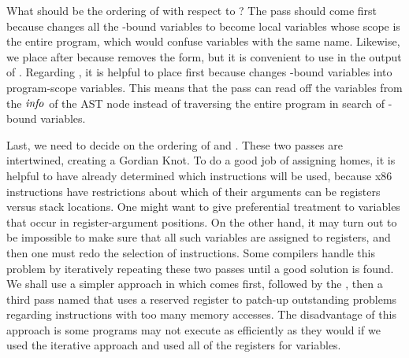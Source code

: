 \documentclass[11pt]{book}
\begin{document}
What should be the ordering of  with respect to
? The  pass should come first because
 changes all the -bound variables to
become local variables whose scope is the entire program, which would
confuse variables with the same name.
%
Likewise, we place  after
 because  removes
the  form, but it is convenient to use  in the
output of .
%
Regarding , it is helpful to place
 first because  changes
-bound variables into program-scope variables.  This means
that the  pass can read off the variables from the
$\mathit{info}$ of the  AST node instead of traversing the
entire program in search of -bound variables.

Last, we need to decide on the ordering of 
and .  These two passes are intertwined, creating a
Gordian Knot. To do a good job of assigning homes, it is helpful to
have already determined which instructions will be used, because x86
instructions have restrictions about which of their arguments can be
registers versus stack locations. One might want to give preferential
treatment to variables that occur in register-argument positions. On
the other hand, it may turn out to be impossible to make sure that all
such variables are assigned to registers, and then one must redo the
selection of instructions. Some compilers handle this problem by
iteratively repeating these two passes until a good solution is found.
We shall use a simpler approach in which 
comes first, followed by the , then a third
pass named  that uses a reserved register to
patch-up outstanding problems regarding instructions with too many
memory accesses. The disadvantage of this approach is some programs
may not execute as efficiently as they would if we used the iterative
approach and used all of the registers for variables.
\end{document}
